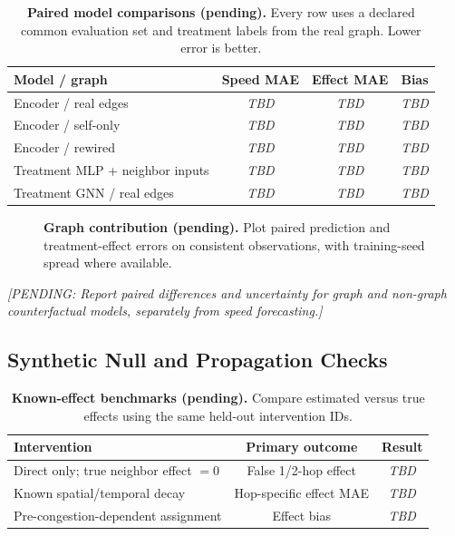 \documentclass[sigconf,nonacm]{acmart}
\newcommand{\pending}[1]{\textcolor{pendinggray}{\emph{[PENDING: #1]}}}
\newcommand{\tbd}{\textcolor{pendinggray}{\textit{TBD}}}
\newcommand{\figslot}[2]{%
  \fbox{\begin{minipage}[c][#1][c]{0.92\columnwidth}
  \centering\small\textcolor{pendinggray}{\textbf{[FIGURE PENDING]}}\\[5pt]
  \textcolor{pendinggray}{#2}
  \end{minipage}}}
\begin{document}
\begin{table}[t]
\centering
\caption{\textbf{Paired model comparisons (pending).}
Every row uses a declared common evaluation set and treatment labels
from the real graph. Lower error is better.}
\label{tab:causalmodels}
\footnotesize
\begin{tabular}{lccc}
\toprule
Model / graph & Speed MAE & Effect MAE & Bias \\
\midrule
Encoder / real edges & \tbd & \tbd & \tbd \\
Encoder / self-only & \tbd & \tbd & \tbd \\
Encoder / rewired & \tbd & \tbd & \tbd \\
Treatment MLP + neighbor inputs & \tbd & \tbd & \tbd \\
Treatment GNN / real edges & \tbd & \tbd & \tbd \\
\bottomrule
\end{tabular}
\end{table}

\begin{figure}[t]
\centering
\figslot{0.98in}{Two aligned panels: (a) held-out forecasting error;\\
(b) known-effect recovery error; real/self-only/rewired topology.}
\caption{\textbf{Graph contribution (pending).} Plot paired
prediction and treatment-effect errors on consistent observations,
with training-seed spread where available.}
\label{fig:ablation}
\end{figure}

\pending{Report paired differences and uncertainty for graph and
non-graph counterfactual models, separately from speed forecasting.}

\subsection{Synthetic Null and Propagation Checks}
\begin{table}[t]
\centering
\caption{\textbf{Known-effect benchmarks (pending).} Compare estimated
versus true effects using the same held-out intervention IDs.}
\label{tab:synthetic}
\footnotesize
\begin{tabular}{p{}cc}
\toprule
Intervention & Primary outcome & Result \\
\midrule
Direct only; true neighbor effect $=0$ & False 1/2-hop effect & \tbd \\
Known spatial/temporal decay & Hop-specific effect MAE & \tbd \\
Pre-congestion-dependent assignment & Effect bias & \tbd \\
\bottomrule
\end{tabular}
\end{table}
\end{document}

